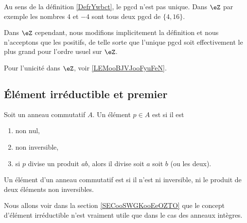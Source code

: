 \begin{remark}
	Au sens de la définition \ref{DefrYwbct}, le pgcd n'est pas unique. Dans \( \eZ\) par exemple les nombres \( 4\) et \( -4\) sont tous deux pgcd de \( \{4,16  \}\).

	Dans \( \eZ\) cependant, nous modifions implicitement la définition et nous n'acceptons que les positifs, de telle sorte que l'unique pgcd soit effectivement le plus grand pour l'ordre usuel sur \( \eZ\).

	Pour l'unicité dans \( \eZ\), voir \ref{LEMooBJVJooFyuFeN}.
\end{remark}


\subsection{Élément irréductible et premier}

\begin{definition}       \label{DEFooZCRQooWXRalw}
	Soit un anneau commutatif \( A\). Un élément \( p\in A\) est  si il est
	\begin{enumerate}
		\item
		      non nul,
		\item
		      non inversible,
		\item       \label{ITEMooPMTTooCVHPIm}
		      si \( p\) divise un produit \( ab\), alors il divise soit \( a\) soit \( b\) (ou les deux).
	\end{enumerate}
\end{definition}

\begin{definition}  \label{DeirredBDhQfA}
	Un élément d'un anneau commutatif est  si il n'est ni inversible, ni le produit de deux éléments non inversibles. 
\end{definition}

\begin{normaltext}
	Nous allons voir dans la section \ref{SECooSWGKooEeOZTO} que le concept d'élément irréductible n'est vraiment utile que dans le cas des anneaux intègres.
\end{normaltext}

